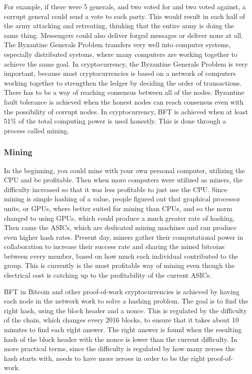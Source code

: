 \documentclass[11pt]{article}
\begin{document}
For example, if there were 5 generals, and two voted for and two voted against, a corrupt general could send a vote to each party. This would result in each half of the army attacking and retreating, thinking that the entire army is doing the same thing.  Messengers could also deliver forged messages or deliver none at all. The Byzantine Generals Problem transfers very well into computer systems, especially distributed systems, where many computers are working together to achieve the same goal. In cryptocurrency, the Byzantine Generals Problem is very important, because most cryptocurrencies is based on a network of computers working together to strengthen the ledger by deciding the order of transactions. There has to be a way of reaching consensus between all of the nodes. Byzantine fault tolerance is achieved when the honest nodes can reach consensus even with the possibility of corrupt nodes. In cryptocurrency, BFT is achieved when at least 51\% of the total computing power is used honestly. This is done through a process called mining.
 
\subsubsection{Mining}\label{subsubsec:mining}

In the beginning, you could mine with your own personal computer, utilizing the CPU and be profitable. Then when more computers were utilized as miners, the difficulty increased so that it was less profitable to just use the CPU. Since mining is  simple hashing of a value, people figured out that graphical processor units, or GPUs, where better suited for mining than CPUs, and so the norm changed to using GPUs, which could produce a much greater rate of hashing. Then came the ASICs, which are dedicated mining machines and can produce even higher hash rates. Present day, miners gather their computational power in collaboration to increase their success rate and sharing the mined bitcoins between every member, based on how much each individual contributed to the group. This is currently is the most profitable way of mining even though the electrical cost is catching up to the profitability of the current ASICs.

BFT in Bitcoin and other proof-of-work cryptocurrencies is achieved by having each node in the network work to solve a hashing problem. The goal is to find the right hash, using the block header and a nonce. This is regulated by the difficulty of the chain, which changes every 2016 blocks, to ensure that it takes about 10 minutes to find each right answer. The right answer is found when the resulting hash of the block header with the nonce is lower than the current difficulty. In more practical terms, since the difficulty is regulated by how many zeroes the hash starts with, needs to have more zeroes in order to be the right proof-of-work.
\end{document}
